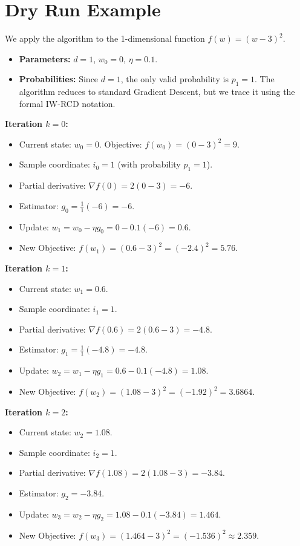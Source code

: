 \documentclass{article}
\begin{document}
\section*{Dry Run Example}
We apply the algorithm to the 1-dimensional function $f(w) = (w-3)^2$. 
\begin{itemize}
    \item \textbf{Parameters:} $d=1$, $w_0=0$, $\eta=0.1$. 
    \item \textbf{Probabilities:} Since $d=1$, the only valid probability is $p_1 = 1$. The algorithm reduces to standard Gradient Descent, but we trace it using the formal IW-RCD notation.
\end{itemize}

\textbf{Iteration $k=0$:}
\begin{itemize}
    \item Current state: $w_0 = 0$. Objective: $f(w_0) = (0-3)^2 = 9$.
    \item Sample coordinate: $i_0 = 1$ (with probability $p_1=1$).
    \item Partial derivative: $\nabla f(0) = 2(0-3) = -6$.
    \item Estimator: $g_0 = \frac{1}{1} (-6) = -6$.
    \item Update: $w_1 = w_0 - \eta g_0 = 0 - 0.1(-6) = 0.6$.
    \item New Objective: $f(w_1) = (0.6-3)^2 = (-2.4)^2 = 5.76$.
\end{itemize}

\textbf{Iteration $k=1$:}
\begin{itemize}
    \item Current state: $w_1 = 0.6$.
    \item Sample coordinate: $i_1 = 1$.
    \item Partial derivative: $\nabla f(0.6) = 2(0.6-3) = -4.8$.
    \item Estimator: $g_1 = \frac{1}{1} (-4.8) = -4.8$.
    \item Update: $w_2 = w_1 - \eta g_1 = 0.6 - 0.1(-4.8) = 1.08$.
    \item New Objective: $f(w_2) = (1.08-3)^2 = (-1.92)^2 = 3.6864$.
\end{itemize}

\textbf{Iteration $k=2$:}
\begin{itemize}
    \item Current state: $w_2 = 1.08$.
    \item Sample coordinate: $i_2 = 1$.
    \item Partial derivative: $\nabla f(1.08) = 2(1.08-3) = -3.84$.
    \item Estimator: $g_2 = -3.84$.
    \item Update: $w_3 = w_2 - \eta g_2 = 1.08 - 0.1(-3.84) = 1.464$.
    \item New Objective: $f(w_3) = (1.464-3)^2 = (-1.536)^2 \approx 2.359$.
\end{itemize}
\end{document}
